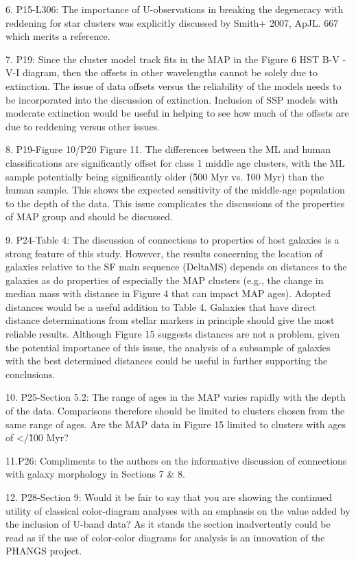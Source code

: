 6. P15-L306: The importance of U-observations in breaking the degeneracy with reddening for star clusters was explicitly discussed by Smith+ 2007, ApJL. 667 which merits a reference.

7. P19: Since the cluster model track fits in the MAP in the Figure 6 HST B-V - V-I diagram, then the offsets in other wavelengths cannot be solely due to extinction. The issue of data offsets versus the reliability of the models needs to be incorporated into the discussion of extinction. Inclusion of SSP models with moderate extinction would be useful in helping to see how much of the offsets are due to reddening versus other issues.

8. P19-Figure 10/P20 Figure 11. The differences between the ML and human classifications are significantly offset for class 1 middle age clusters, with the ML sample potentially being significantly older (\~500 Myr vs. \~100 Myr) than the human sample. This shows the expected sensitivity of the middle-age population to the depth of the data. This issue complicates the discussions of the properties of MAP group and should be discussed.

9. P24-Table 4: The discussion of connections to properties of host galaxies is a strong feature of this study. However, the results concerning the location of galaxies relative to the SF main sequence (DeltaMS) depends on distances to the galaxies as do properties of especially the MAP clusters (e.g., the change in median mass with distance in Figure 4 that can impact MAP ages). Adopted distances would be a useful addition to Table 4. Galaxies that have direct distance determinations from stellar markers in principle should give the most reliable results. Although Figure 15 suggests distances are not a problem, given the potential importance of this issue, the analysis of a subsample of galaxies with the best determined distances could be useful in further supporting the conclusions.

10. P25-Section 5.2: The range of ages in the MAP varies rapidly with the depth of the data. Comparisons therefore should be limited to clusters chosen from the same range of ages. Are the MAP data in Figure 15 limited to clusters with ages of </\~100 Myr?

11.P26: Compliments to the authors on the informative discussion of connections with galaxy morphology in Sections 7 \& 8.

12. P28-Section 9: Would it be fair to say that you are showing the continued utility of classical color-diagram analyses with an emphasis on the value added by the inclusion of U-band data? As it stands the section inadvertently could be read as if the use of color-color diagrams for analysis is an innovation of the PHANGS project.

